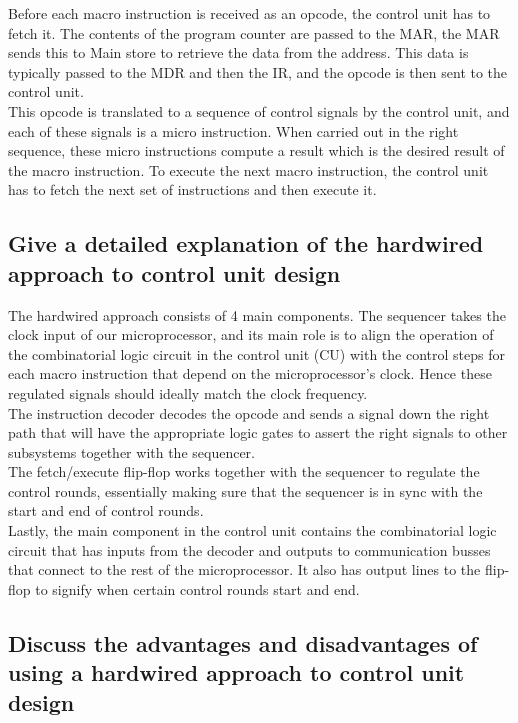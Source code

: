 \documentclass{article}
\begin{document}
Before each macro instruction is received as an opcode, the control unit has to fetch it. The contents of the program counter are passed to the MAR, the MAR sends this to Main store to retrieve the data from the address. This data is typically passed to the MDR and then the IR, and the opcode is then sent to the control unit. \\
This opcode is translated to a sequence of control signals by the control unit, and each of these signals is a micro instruction. When carried out in the right sequence, these micro instructions compute a result which is the desired result of the macro instruction. To execute the next macro instruction, the control unit has to fetch the next set of instructions and then execute it.


\subsection{Give a detailed explanation of the hardwired approach to control unit design}

The hardwired approach consists of 4 main components. The sequencer takes the clock input of our microprocessor, and its main role is to align the operation of the combinatorial logic circuit in the control unit (CU) with the control steps for each macro instruction that depend on the microprocessor's clock. Hence these regulated signals should ideally match the clock frequency. \\
The instruction decoder decodes the opcode and sends a signal down the right path that will have the appropriate logic gates to assert the right signals to other subsystems together with the sequencer. \\
The fetch/execute flip-flop works together with the sequencer to regulate the control rounds, essentially making sure that the sequencer is in sync with the start and end of control rounds.\\
Lastly, the main component in the control unit contains the combinatorial logic circuit that has inputs from the decoder and outputs to communication busses that connect to the rest of the microprocessor. It also has output lines to the flip-flop to signify when certain control rounds start and end.

\subsection{Discuss the advantages and disadvantages of using a hardwired approach to control unit design}
\end{document}
